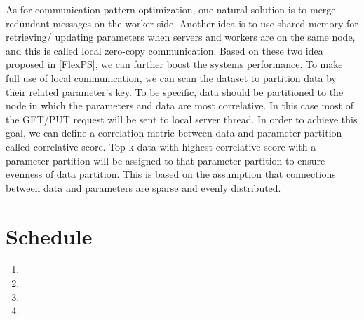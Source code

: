 \documentclass{article}
\begin{document}
\noindent As for communication pattern optimization, one natural solution is to merge redundant messages on the worker side. Another idea is to use shared memory for retrieving/ updating parameters when servers and workers are on the same node, and this is called local zero-copy communication. Based on these two idea proposed in [FlexPS], we can further boost the systems performance. To make full use of local communication, we can scan the dataset to partition data by their related parameter’s key. To be specific, data should be partitioned to the node in which the parameters and data are most correlative. In this case most of the GET/PUT request will be sent to local server thread. In order to achieve this goal, we can define a correlation metric between data and parameter partition called correlative score. Top k data with highest correlative score with a parameter partition will be assigned to that parameter partition to ensure evenness of data partition. This is based on the assumption that connections between data and parameters are sparse and evenly distributed.


\section{Schedule}

\begin{enumerate}
\item {}
\item {}
\item {}
\item {}
\end{enumerate}
\end{document}
